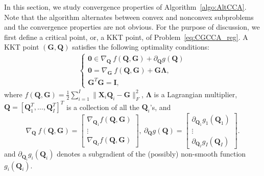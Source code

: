 \documentclass[10pt,journal]{IEEEtran}
\newcommand{\G}{\boldsymbol{G}}
\newcommand{\Q}{\boldsymbol{Q}}
\newcommand{\X}{\boldsymbol{X}}
\begin{document}
In this section, we study convergence properties of Algorithm~\ref{algo:AltCCA}.
Note that the algorithm alternates between convex and nonconvex subproblems and the convergence properties are not obvious.
For the purpose of discussion, we first define a critical point, or, a KKT point, of Problem~\eqref{eq:CGCCA_reg}.
A KKT point $(\G,\Q)$ satisfies the following optimality conditions:
\begin{align}\label{eq:KKT}
\begin{cases}
 {\bm 0}\in \nabla_{\Q}~f(\Q,\G) + \partial_{\Q} g(\Q)\\
 {\bm 0}= \nabla_{\G}~f(\Q,\G) + \G{\bm \Lambda},\\
 \G^T\G = \bm I,
\end{cases}
\end{align}
where $f(\Q,\G)=\frac{1}{2}\sum_{i=1}^I\|\X_i\Q_i-\G\|_F^2$, ${\bm \Lambda}$
is a Lagrangian multiplier, $\Q=[\Q_1^T,\ldots,\Q_I^T]^T$ is a collection of
all the $\Q_i$'s, and
\begin{equation}\label{eq:definie_diff}
\nabla_{\Q}~f(\Q,\G) =\begin{bmatrix}
          \nabla_{\Q_1}f(\Q,\G)\\
          \vdots\\
          \nabla_{\Q_I}f(\Q,\G)
\end{bmatrix},~
\partial_{\Q} g(\Q) =\begin{bmatrix}
         \partial_{\Q_1} g_1(\Q_1)\\
          \vdots\\
          \partial_{\Q_I} g_I(\Q_I)
\end{bmatrix}.
\end{equation}
and $\partial_{\Q_i} g_i(\Q_i)$ denotes a subgradient of the (possibly) non-smooth function $g_i(\Q_i)$.
%
\end{document}
